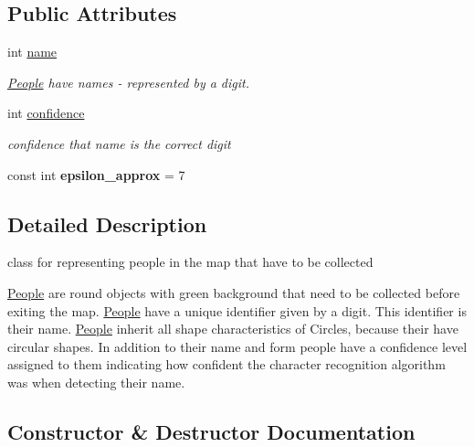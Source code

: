 \subsection*{Public Attributes}
\begin{DoxyCompactItemize}
\item 
\mbox{\label{class_people_a06e995c8c3b9808db931bedb44d782c8}} 
int \mbox{\hyperlink{class_people_a06e995c8c3b9808db931bedb44d782c8}{name}}
\begin{DoxyCompactList}\small\item\em \mbox{\hyperlink{class_people}{People}} have names -\/ represented by a digit. \end{DoxyCompactList}\item 
\mbox{\label{class_people_a44d79c52132068763c91e308e9685e06}} 
int \mbox{\hyperlink{class_people_a44d79c52132068763c91e308e9685e06}{confidence}}
\begin{DoxyCompactList}\small\item\em confidence that name is the correct digit \end{DoxyCompactList}\item 
\mbox{\label{class_people_a910be85a90d059aaa122c6d970d28a97}} 
const int {\bfseries epsilon\+\_\+approx} = 7
\end{DoxyCompactItemize}


\subsection{Detailed Description}
class for representing people in the map that have to be collected 

\mbox{\hyperlink{class_people}{People}} are round objects with green background that need to be collected before exiting the map. \mbox{\hyperlink{class_people}{People}} have a unique identifier given by a digit. This identifier is their name. \mbox{\hyperlink{class_people}{People}} inherit all shape characteristics of Circles, because their have circular shapes. In addition to their name and form people have a confidence level assigned to them indicating how confident the character recognition algorithm was when detecting their name. 

\subsection{Constructor \& Destructor Documentation}
\mbox{\label{class_people_aae1408eddfd15a5007003ecdf1507941}} 

